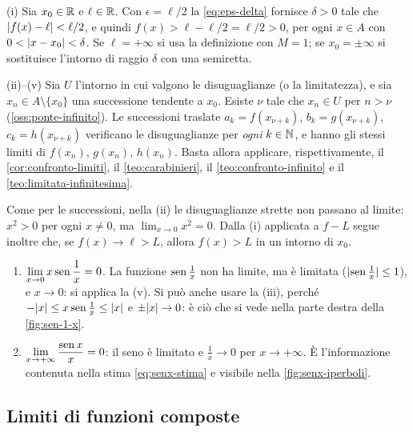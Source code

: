 \begin{dimostrazione}
(i) Sia $x_{0}\in\mathbb{R}$ e $\ell\in\mathbb{R}$. Con $\epsilon=\ell/2$ la \eqref{eq:eps-delta} fornisce
$\delta>0$ tale che $\lvert f(x)-\ell\rvert<\ell/2$, e quindi $f(x)>\ell-\ell/2=\ell/2>0$, per
ogni $x\in A$ con $0<\lvert x-x_{0}\rvert<\delta$. Se $\ell=+\infty$ si usa la definizione con
$M=1$; se $x_{0}=\pm\infty$ si sostituisce l'intorno di raggio $\delta$ con una semiretta.

(ii)--(v) Sia $U$ l'intorno in cui valgono le disuguaglianze (o la limitatezza), e sia
$x_{n}\in A\setminus\{x_{0}\}$ una successione tendente a $x_{0}$. Esiste $\nu$ tale che
$x_{n}\in U$ per $n>\nu$ (\cref{oss:ponte-infinito}). Le successioni traslate
$a_{k}=f(x_{\nu+k})$, $b_{k}=g(x_{\nu+k})$, $c_{k}=h(x_{\nu+k})$ verificano le
disuguaglianze per \emph{ogni} $k\in\mathbb{N}$, e hanno gli stessi limiti di $f(x_{n})$,
$g(x_{n})$, $h(x_{n})$. Basta allora applicare, rispettivamente, il
\cref{cor:confronto-limiti}, il \cref{teo:carabinieri}, il \cref{teo:confronto-infinito}
e il \cref{teo:limitata-infinitesima}.
\end{dimostrazione}

\begin{osservazione}
Come per le successioni, nella (ii) le disuguaglianze strette non passano al limite:
$x^{2}>0$ per ogni $x\neq0$, ma $\lim_{x\to0}x^{2}=0$. Dalla (i) applicata a $f-L$ segue
inoltre che, se $f(x)\to\ell>L$, allora $f(x)>L$ in un intorno di $x_{0}$.
\end{osservazione}

\begin{esempio}\label{es:x-sen-1-x}
\begin{enumerate}[label=\textup{(\roman*)}]
  \item $\displaystyle\lim_{x\to0}x\operatorname{sen}\frac1x=0$. La funzione $\operatorname{sen}\frac1x$ non ha
  limite, ma è limitata ($\lvert \operatorname{sen}\frac1x\rvert\le1$), e $x\to0$: si applica la (v). Si può
  anche usare la (iii), perché $-\lvert x\rvert\le x\operatorname{sen}\frac1x\le\lvert x\rvert$ e $\pm\lvert x\rvert\to0$:
  è ciò che si vede nella parte destra della \cref{fig:sen-1-x}.
  \item $\displaystyle\lim_{x\to+\infty}\frac{\operatorname{sen} x}{x}=0$: il seno è limitato e
  $\frac1x\to0$ per $x\to+\infty$. È l'informazione contenuta nella stima
  \eqref{eq:senx-stima} e visibile nella \cref{fig:senx-iperboli}.
\end{enumerate}
\end{esempio}

\subsection{Limiti di funzioni composte}

